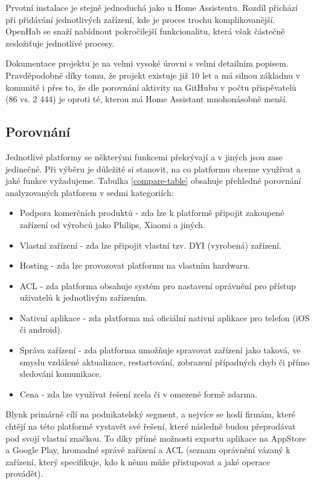 Prvotní instalace je stejně jednoduchá jako u Home Assistentu. Rozdíl přichází při přidávání jednotlivých zařízení, kde je proces trochu komplikovanější. OpenHab se snaží nabídnout pokročilejší funkcionalitu, která však částečně zesložiťuje jednotlivé procesy. \cite{openhab-doc}

Dokumentace projektu je na velmi vysoké úrovni s velmi detailním popisem. Pravděpodobně díky tomu, že projekt existuje již 10 let a má silnou základnu v komunitě i přes to, že dle porovnání aktivity na GitHubu v počtu přispěvatelů (86 vs. 2 444) je oproti té, kterou má Home Assistant mnohonásobně menší.

\subsection{Porovnání}
Jednotlivé platformy se některými funkcemi překrývají a v jiných jsou zase jedinečné. Při výběru je důležité si stanovit, na co platformu chceme využívat a jaké funkce vyžadujeme. Tabulka \ref{compare-table} obsahuje přehledné porovnání analyzovaných platforem v sedmi kategoriích:
\begin{itemize}
    \item Podpora komerčních produktů - zda lze k platformě připojit zakoupené zařízení od výrobců jako Philips, Xiaomi a jiných.
    \item Vlastní zařízení - zda lze připojit vlastní tzv. DYI (vyrobená) zařízení.
    \item Hosting - zda lze provozovat platformu na vlastním hardwaru.
    \item ACL - zda platforma obsahuje systém pro nastavení oprávnění pro přístup uživatelů k jednotlivým zařízením.
    \item Nativní aplikace - zda platforma má oficiální nativní aplikace pro telefon (iOS či android).
    \item Správa zařízení - zda platforma umožňuje spravovat zařízení jako taková, ve smyslu vzdálené aktualizace, restartování, zobrazení případných chyb či přímo sledování komunikace.
    \item Cena - zda lze využívat řešení zcela či v omezené formě zdarma.
\end{itemize}

Blynk primárně cílí na podnikatelský segment, a nejvíce se hodí firmám, které chtějí na této platformě vystavět své řešení, které následně budou přeprodávat pod svojí vlastní značkou. To díky přímé možnosti exportu aplikace na AppStore a Google Play, hromadné správě zařízení a ACL (seznam oprávnění vázaný k zařízení, který specifikuje, kdo k němu může přistupovat a jaké operace provádět).

